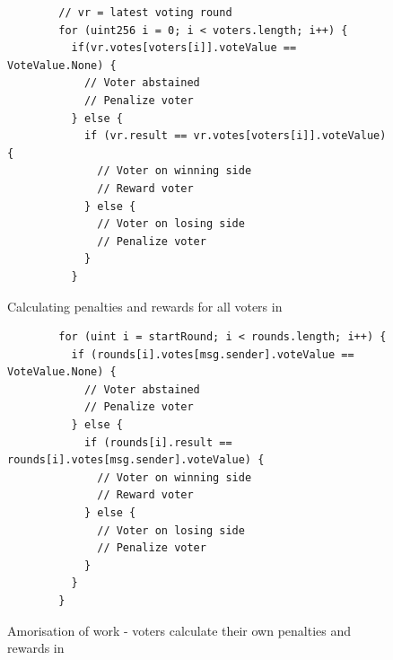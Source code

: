\begin{figure}
  \begin{minipage}{\textwidth}
    \begin{framed}
      \begin{lstlisting}
        // vr = latest voting round
        for (uint256 i = 0; i < voters.length; i++) {
          if(vr.votes[voters[i]].voteValue == VoteValue.None) {
            // Voter abstained
            // Penalize voter
          } else {
            if (vr.result == vr.votes[voters[i]].voteValue) {
              // Voter on winning side
              // Reward voter
            } else {
              // Voter on losing side
              // Penalize voter
            }
          }
        \end{lstlisting}
    \end{framed}
  \end{minipage}
  \caption{Calculating penalties and rewards for all voters in }
\end{figure}

\begin{figure}
  \begin{minipage}{\textwidth}
    \begin{framed}
      \begin{lstlisting}
        for (uint i = startRound; i < rounds.length; i++) {
          if (rounds[i].votes[msg.sender].voteValue == VoteValue.None) {
            // Voter abstained
            // Penalize voter
          } else {
            if (rounds[i].result == rounds[i].votes[msg.sender].voteValue) {
              // Voter on winning side
              // Reward voter
            } else {
              // Voter on losing side
              // Penalize voter
            }
          }
        }
      \end{lstlisting}
    \end{framed}
  \end{minipage}
  \caption{Amorisation of work - voters calculate their own penalties and
    rewards in }
\end{figure}

